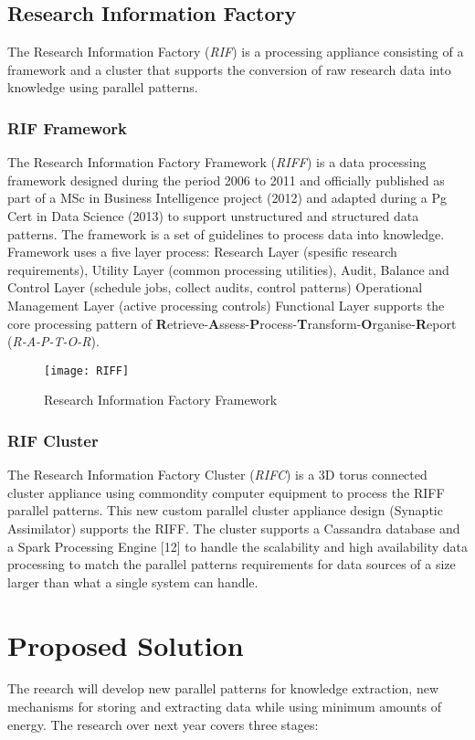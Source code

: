 \documentclass{acm_proc_article-sp}
\begin{document}
\subsection{Research Information Factory}
The Research Information Factory (\textit{RIF}) is a processing appliance consisting of a framework and a cluster that supports the conversion of raw research data into knowledge using parallel patterns. 
\subsubsection{RIF Framework}
The Research Information Factory Framework (\textit{RIFF}) is a data processing framework designed 
during the period 2006 to 2011 and officially published as part of a MSc in Business Intelligence project (2012) and adapted during a Pg Cert in Data Science (2013) \cite{ajima2009tofu} to support unstructured and structured data patterns.  
The framework is a set of guidelines to process data into knowledge. 
Framework uses a five layer process: Research Layer (spesific research requirements), Utility Layer (common processing utilities), Audit, Balance and Control Layer (schedule jobs, collect audits, control patterns)
Operational Management Layer (active processing controls) Functional Layer supports the core processing pattern of \textbf{R}etrieve-\textbf{A}ssess-\textbf{P}rocess-\textbf{T}ransform-\textbf{O}rganise-\textbf{R}eport (\textit{R-A-P-T-O-R}). 
\begin{figure}
  \centering
  \texttt{[image: RIFF]}
  \caption{Research Information Factory Framework}
\end{figure}
\subsubsection{RIF Cluster}
The Research Information Factory Cluster (\textit{RIFC}) is a 3D torus connected cluster appliance using commondity computer equipment to process the RIFF parallel patterns. This new custom parallel cluster appliance design \cite{ajima2009tofu}(Synaptic Assimilator) supports the RIFF. The cluster supports a Cassandra database \cite{cassandrawebsite} and a Spark Processing Engine [12] to handle the scalability and high availability data processing to match the parallel patterns requirements for data sources of a size larger than what a single system can handle.
\section{Proposed Solution}
The reearch will develop new parallel patterns for knowledge extraction, new mechanisms for storing and extracting data while using minimum amounts of energy.
The research over next year covers three stages:
\end{document}
